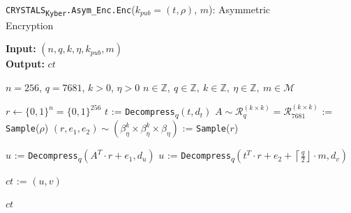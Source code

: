 \documentclass[runningheads]{llncs}
\numberwithin{equation}{section}
\begin{document}
    
    \begin{algorithm}
        \caption{\texorpdfstring{\texttt{CRYSTALS}\textsubscript{\texttt{Kyber}}\texttt{.Asym\_Enc}\texttt{.Enc}(${k}_{pub} = (t, \rho)$, $m$)}\/: Asymmetric\\ \phantom{|..................................................................................................}Encryption}
        \label{subrou:crystals-kyber-asymmetric-encryption-enc}
        
        \textbf{Input:} $\left( n, q, k, \eta, {k}_{pub}, m \right)$\\
        \textbf{Output:} $ ct $
        
        \begin{algorithmic}[1]
            \Require $n = 256$, $q = 7681$, $k > 0$, $\eta > 0$
            \Ensure $n \in \mathbb{Z},\ q \in \mathbb{Z},\ k \in \mathbb{Z},\ \eta \in \mathbb{Z},\ m \in \mathcal{M}$
        
            \vspace{2ex}
            
            \State $r \gets { \{ 0 , 1 \} }^{n} = { \{ 0 , 1 \} }^{256}$
            \State $t$ := \texttt{Decompress}\textsubscript{$q$}$(t, {d}_{t})$
            \State $A \sim {\mathcal{R}}_{q}^{( k \times k )} = {\mathcal{R}}_{7681}^{( k \times k )}$ := \texttt{Sample}($\rho$)
            \State $(r, {e}_{1}, {e}_{2}) \sim \left( {\beta}_{\eta}^{k} \times {\beta}_{\eta}^{k} \times {\beta}_{\eta} \right)$ := \texttt{Sample}($r$)

            \vspace{1ex}
            
            \State $u$ := \texttt{Decompress}\textsubscript{$q$}$({A}^{T} \cdot r + {e}_{1}, {d}_{u})$
            \State $u$ := \texttt{Decompress}\textsubscript{$q$}$({t}^{T} \cdot r + {e}_{2} + \left\lceil \frac{q}{2} \right\rfloor \cdot m, {d}_{v})$
            
            \vspace{1ex}

            \State $ct$ := $(u, v)$
            
            \vspace{1ex}
            
            \State \Return $ct$
        \end{algorithmic}
    \end{algorithm}
\end{document}

